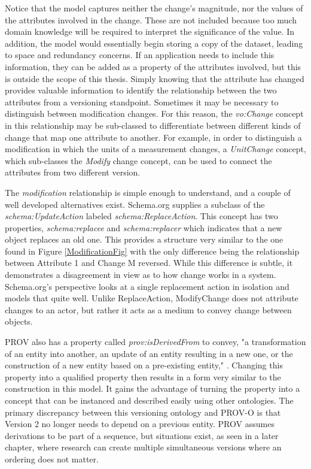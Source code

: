 Notice that the model captures neither the change's magnitude, nor the values of the attributes involved in the change.
These are not included because too much domain knowledge will be required to interpret the significance of the value.
In addition, the model would essentially begin storing a copy of the dataset, leading to space and redundancy concerns.
If an application needs to include this information, they can be added as a property of the attributes involved, but this is outside the scope of this thesis.
Simply knowing that the attribute has changed provides valuable information to identify the relationship between the two attributes from a versioning standpoint.
Sometimes it may be necessary to distinguish between modification changes.
For this reason, the \textit{vo:Change} concept in this relationship may be sub-classed to differentiate between different kinds of change that map one attribute to another.
For example, in order to distinguish a modification in which the units of a measurement changes, a \textit{UnitChange} concept, which sub-classes the \textit{Modify} change concept, can be used to connect the attributes from two different version.

The \textit{modification} relationship is simple enough to understand, and a couple of well developed alternatives exist.
Schema.org supplies a subclass of the \textit{schema:UpdateAction} labeled \textit{schema:ReplaceAction}.
This concept has two properties, \textit{schema:replacee} and \textit{schema:replacer} which indicates that a new object replaces an old one.
This provides a structure very similar to the one found in Figure \ref{ModificationFig} with the only difference being the relationship between Attribute 1 and Change M reversed.
While this difference is subtle, it demonstrates a disagreement in view as to how change works in a system.
Schema.org's perspective looks at a single replacement action in isolation and models that quite well.
Unlike ReplaceAction, ModifyChange does not attribute changes to an actor, but rather it acts as a medium to convey change between objects.

PROV also has a property called \textit{prov:isDerivedFrom} to convey, "a transformation of an entity into another, an update of an entity resulting in a new one, or the construction of a new entity based on a pre-existing entity," \cite{Lebo2013}.
Changing this property into a qualified property then results in a form very similar to the construction in this model.
It gains the advantage of turning the property into a concept that can be instanced and described easily using other ontologies.
The primary discrepancy between this versioning ontology and PROV-O is that Version 2 no longer needs to depend on a previous entity.
PROV assumes derivations to be part of a sequence, but situations exist, as seen in a later chapter, where research can create multiple simultaneous versions where an ordering does not matter.

